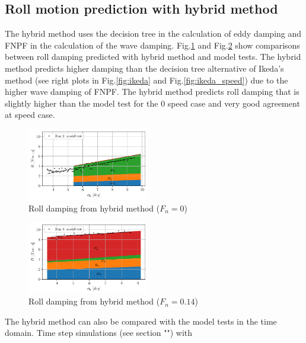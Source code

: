 \subsection*{Roll motion prediction with hybrid
method}\label{roll-motion-prediction-with-hybrid-method}
The hybrid method uses the decision tree in the calculation of eddy
damping and FNPF in the calculation of the wave damping.
Fig.\ref{fig:hybrid_0} and Fig.\ref{fig:hybrid_speed}
show comparisons between roll damping predicted with hybrid method and
model tests. The hybrid method predicts higher damping than the decision
tree alternative of Ikeda's method (see right plots in
Fig.\ref{fig:ikeda} and Fig.\ref{fig:ikeda_speed}) due
to the higher wave damping of FNPF. The hybrid method predicts roll
damping that is slightly higher than the model test for the 0 speed case
and very good agreement at speed case.
\begin{figure}[H]
\begin{center}\includegraphics[width = 0.475\textwidth]{figures/hybrid_0.pdf}\end{center}
\vspace{-1cm}
\caption{Roll damping from hybrid method ($F_n = 0$)}
\label{fig:hybrid_0}
\end{figure}
\begin{figure}[H]
\begin{center}\includegraphics[width = 0.475\textwidth]{figures/hybrid_speed.pdf}\end{center}
\vspace{-1cm}
\caption{Roll damping from hybrid method ($F_n = 0.14$)}
\label{fig:hybrid_speed}
\end{figure}
The hybrid method can also be compared with the model tests in the time
domain. Time step simulations (see section "") with

